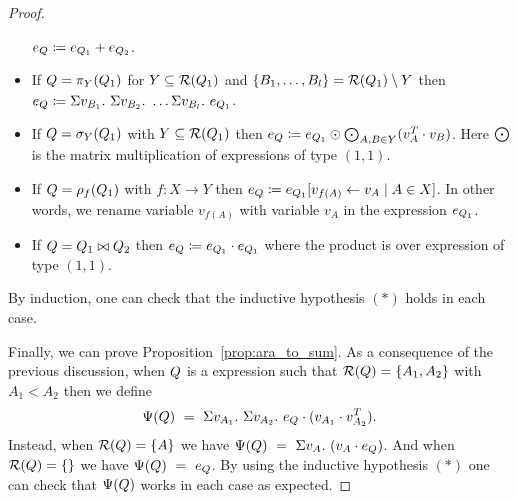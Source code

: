 \begin{proof}
\begin{itemize}
	$e_{Q}\coloneqq e_{Q_1} + e_{Q_2}$.
	\item If $Q=\pi_{Y}(Q_1)$ for $Y\subseteq \mathcal{R}(Q_1)$ and $\{B_1, \ldots, B_l\} = \mathcal{R}(Q_1) \setminus Y$ then
	$
	e_{Q}\coloneqq  \Sigma v_{B_1}. \ \Sigma v_{B_2}. \ \ldots \Sigma v_{B_l}. \ e_{Q_1}
	$.
	\item If $Q=\sigma_{Y}(Q_1)$ with $Y\subseteq\mathcal{R}(Q_1)$ then
	$
	e_{Q}\coloneqq e_{Q_1} \odot \bigodot_{A,B\in Y} (v_{A}^T \cdot v_{B})
	$.
	Here $\bigodot$ is the matrix multiplication of expressions of type $(1,1)$.
	\item If $Q=\rho_{f}(Q_1)$ with $f: X \rightarrow Y$ then
	$e_{Q}\coloneqq e_{Q_1}[v_{f(A)} \gets v_A\mid A\in X]$.
	In other words, we rename variable $v_{f(A)}$ with variable $v_A$ in the expression $e_{Q_1}$. 
	\item If $Q=Q_1\bowtie Q_2$ then
	$e_{Q}\coloneqq e_{Q_1} \cdot e_{Q_1}$ where the product is over expression of type $(1,1)$.
\end{itemize}
By induction, one can check that the inductive hypothesis $(*)$ holds in each case. 

Finally, we can prove Proposition~\ref{prop:ara_to_sum}.
As a consequence of the previous discussion, when $Q$ is a \rak expression 
such that $\mathcal{R}(Q)=\{A_1,A_2\}$ with $A_1<A_2$ then we define
$$
\Psi(Q) \ = \ \Sigma v_{A_1}. \ \Sigma v_{A_2}. \ e_{Q} \cdot (v_{A_1} \cdot v_{A_2}^T). 
$$
Instead, when $\mathcal{R}(Q)=\{A\}$ we have $
\Psi(Q) \ = \ \Sigma v_{A}. \  (v_{A} \cdot e_{Q})$.
And when $\mathcal{R}(Q)=\{\}$ we have $
\Psi(Q) \ = \ e_{Q}
$.
By using the inductive hypothesis $(*)$ one can check that $\Psi(Q)$ works in each case as expected. 
\end{proof}
 
